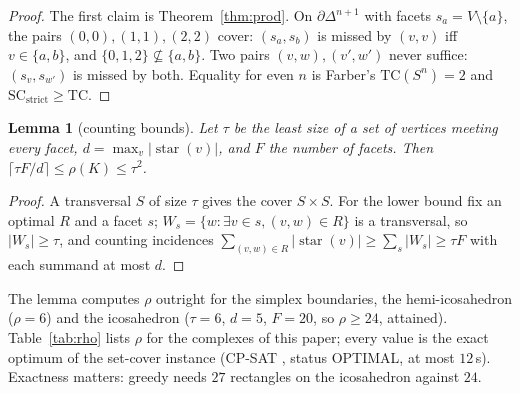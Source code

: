 \documentclass[12pt]{article}
\newcommand{\TC}{\mathrm{TC}}
\newcommand{\SC}{\mathrm{SC}}
\newcommand{\SCst}{\SC_{\mathrm{strict}}}
\newtheorem{lemma}[theo]{Lemma}
\begin{document}
\begin{proof}
The first claim is Theorem~\ref{thm:prod}.  On $\partial\Delta^{n+1}$ with
facets $s_a=V\setminus\{a\}$, the pairs $(0,0),(1,1),(2,2)$ cover: $(s_a,s_b)$
is missed by $(v,v)$ iff $v\in\{a,b\}$, and $\{0,1,2\}\not\subseteq\{a,b\}$.
Two pairs $(v,w),(v',w')$ never suffice: $(s_v,s_{w'})$ is missed by both.
Equality for even $n$ is Farber's $\TC(S^n)=2$ \cite{F03} and $\SCst\ge\TC$.
\end{proof}

\begin{lemma}[counting bounds]\label{lem:rows}
Let $\tau$ be the least size of a set of vertices meeting every facet,
$d=\max_v|\operatorname{star}(v)|$, and $F$ the number of facets.  Then
$\lceil\tau F/d\rceil\le\rho(K)\le\tau^2$.
\end{lemma}

\begin{proof}
A transversal $S$ of size $\tau$ gives the cover $S\times S$.  For the lower
bound fix an optimal $R$ and a facet $s$; $W_s=\{w:\exists v\in s,(v,w)\in
R\}$ is a transversal, so $|W_s|\ge\tau$, and counting incidences
$\sum_{(v,w)\in R}|\operatorname{star}(v)|\ge\sum_s|W_s|\ge\tau F$ with each
summand at most $d$.
\end{proof}

The lemma computes $\rho$ outright for the simplex boundaries, the
hemi-icosahedron ($\rho=6$) and the icosahedron ($\tau=6$, $d=5$, $F=20$,
so $\rho\ge24$, attained).  Table~\ref{tab:rho} lists $\rho$ for the
complexes of this paper; every value is the exact optimum of the set-cover
instance (CP-SAT \cite{ORTools}, status OPTIMAL, at most $12$\,s).  Exactness matters: greedy
needs $27$ rectangles on the icosahedron against $24$.
\end{document}
